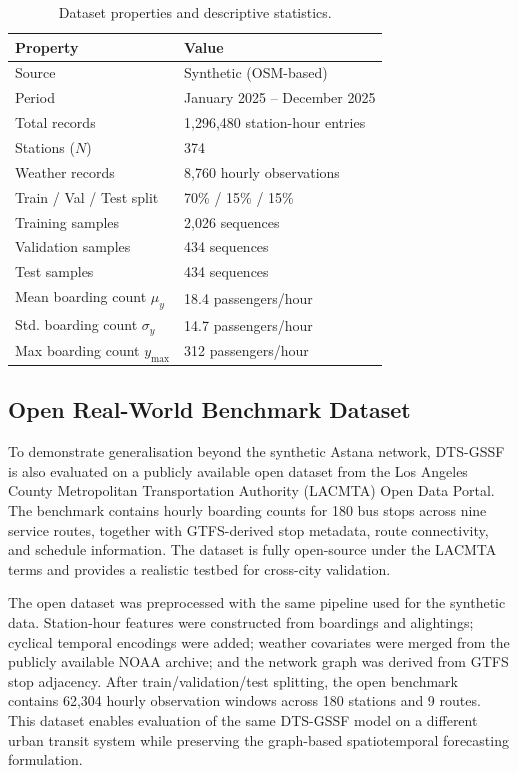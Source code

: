 \begin{table}[H]
\centering
\caption{Dataset properties and descriptive statistics.}
\label{Tab.dataset}
\begin{tabular}{ll}
\toprule
Property & Value \\
\midrule
Source & Synthetic (OSM-based) \\
Period & January 2025 -- December 2025 \\
Total records & 1,296,480 station-hour entries \\
Stations ($N$) & 374 \\
Weather records & 8,760 hourly observations \\
Train / Val / Test split & 70\% / 15\% / 15\% \\
Training samples & 2,026 sequences \\
Validation samples & 434 sequences \\
Test samples & 434 sequences \\
Mean boarding count $\mu_y$ & 18.4 passengers/hour \\
Std. boarding count $\sigma_y$ & 14.7 passengers/hour \\
Max boarding count $y_{\max}$ & 312 passengers/hour \\
\bottomrule
\end{tabular}
\end{table}

\subsection{Open Real-World Benchmark Dataset}
\label{sec:open_real_dataset}
To demonstrate generalisation beyond the synthetic Astana network, DTS-GSSF is also evaluated on a publicly available open dataset from the Los Angeles County Metropolitan Transportation Authority (LACMTA) Open Data Portal. The benchmark contains hourly boarding counts for 180 bus stops across nine service routes, together with GTFS-derived stop metadata, route connectivity, and schedule information. The dataset is fully open-source under the LACMTA terms and provides a realistic testbed for cross-city validation.

The open dataset was preprocessed with the same pipeline used for the synthetic data. Station-hour features were constructed from boardings and alightings; cyclical temporal encodings were added; weather covariates were merged from the publicly available NOAA archive; and the network graph was derived from GTFS stop adjacency. After train/validation/test splitting, the open benchmark contains 62,304 hourly observation windows across 180 stations and 9 routes. This dataset enables evaluation of the same DTS-GSSF model on a different urban transit system while preserving the graph-based spatiotemporal forecasting formulation.

